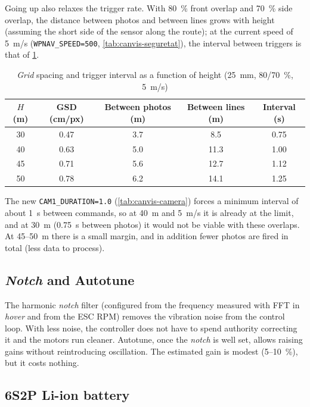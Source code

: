 Going up also relaxes the trigger rate. With 80~\% front overlap and 70~\% side overlap, the distance between photos and between lines grows with height (assuming the short side of the sensor along the route); at the current speed of 5~m/s (\texttt{WPNAV\_SPEED=500}, \cref{tab:canvis-seguretat}), the interval between triggers is that of \cref{tab:ritme-dispar}.

\begin{table}[H]
    \centering
    \caption{\emph{Grid} spacing and trigger interval as a function of height (25~mm, 80/70~\%, 5~m/s)}
    \label{tab:ritme-dispar}
    \small
    \begin{tabular}{ccccc}
        \toprule
        $H$ (m) & GSD (cm/px) & Between photos (m) & Between lines (m) & Interval (s) \\
        \midrule
        30 & 0.47 & 3.7 & 8.5 & 0.75 \\
        40 & 0.63 & 5.0 & 11.3 & 1.00 \\
        45 & 0.71 & 5.6 & 12.7 & 1.12 \\
        50 & 0.78 & 6.2 & 14.1 & 1.25 \\
        \bottomrule
    \end{tabular}
\end{table}

The new \texttt{CAM1\_DURATION=1.0} (\cref{tab:canvis-camera}) forces a minimum interval of about 1~s between commands, so at 40~m and 5~m/s it is already at the limit, and at 30~m (0.75~s between photos) it would not be viable with these overlaps. At 45--50~m there is a small margin, and in addition fewer photos are fired in total (less data to process).

\subsection{\emph{Notch} and Autotune}
\label{subsec:autonomia-notch}

The harmonic \emph{notch} filter (configured from the frequency measured with FFT in \emph{hover} and from the ESC RPM) removes the vibration noise from the control loop. With less noise, the controller does not have to spend authority correcting it and the motors run cleaner. Autotune, once the \emph{notch} is well set, allows raising gains without reintroducing oscillation. The estimated gain is modest (5--10~\%), but it costs nothing.

\subsection{6S2P Li-ion battery}
\label{subsec:autonomia-liion}

